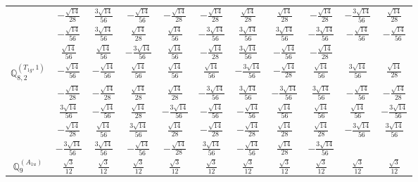 \documentclass[fleqn,10pt,landscape]{article}
\begin{document}
\begin{itemize}
{\begin{center}
\begin{longtable}{ccccccccccc}
& $ - \frac{\sqrt{14}}{28} $ & $ \frac{3 \sqrt{14}}{56} $ & $ - \frac{\sqrt{14}}{56} $ & $ - \frac{\sqrt{14}}{28} $ & $ - \frac{\sqrt{14}}{28} $ & $ \frac{\sqrt{14}}{28} $ & $ \frac{\sqrt{14}}{28} $ & $ - \frac{\sqrt{14}}{28} $ & $ - \frac{3 \sqrt{14}}{56} $ & $ \frac{\sqrt{14}}{28} $ \\
& $ - \frac{\sqrt{14}}{56} $ & $ \frac{3 \sqrt{14}}{56} $ & $ \frac{\sqrt{14}}{28} $ & $ \frac{\sqrt{14}}{56} $ & $ - \frac{3 \sqrt{14}}{56} $ & $ \frac{3 \sqrt{14}}{56} $ & $ \frac{3 \sqrt{14}}{56} $ & $ - \frac{3 \sqrt{14}}{56} $ & $ - \frac{\sqrt{14}}{56} $ & $ - \frac{\sqrt{14}}{56} $ \\
& $ \frac{\sqrt{14}}{56} $ & $ \frac{\sqrt{14}}{56} $ & $ - \frac{3 \sqrt{14}}{56} $ & $ \frac{\sqrt{14}}{56} $ & $ - \frac{\sqrt{14}}{28} $ & $ \frac{3 \sqrt{14}}{56} $ & $ - \frac{\sqrt{14}}{56} $ & $ - \frac{\sqrt{14}}{28} $ & $  $ & $  $ \\ \hline
$\mathbb{Q}_{8,2}^{(T_{1g},1)}$ & $ - \frac{\sqrt{14}}{56} $ & $ - \frac{\sqrt{14}}{56} $ & $ \frac{\sqrt{14}}{56} $ & $ \frac{\sqrt{14}}{56} $ & $ \frac{\sqrt{14}}{56} $ & $ - \frac{3 \sqrt{14}}{56} $ & $ - \frac{\sqrt{14}}{28} $ & $ \frac{\sqrt{14}}{56} $ & $ \frac{3 \sqrt{14}}{56} $ & $ \frac{\sqrt{14}}{28} $ \\
& $ - \frac{\sqrt{14}}{28} $ & $ - \frac{\sqrt{14}}{28} $ & $ \frac{\sqrt{14}}{28} $ & $ \frac{\sqrt{14}}{28} $ & $ - \frac{3 \sqrt{14}}{56} $ & $ \frac{3 \sqrt{14}}{56} $ & $ - \frac{3 \sqrt{14}}{56} $ & $ \frac{3 \sqrt{14}}{56} $ & $ - \frac{\sqrt{14}}{56} $ & $ - \frac{\sqrt{14}}{28} $ \\
& $ \frac{3 \sqrt{14}}{56} $ & $ - \frac{\sqrt{14}}{56} $ & $ \frac{\sqrt{14}}{28} $ & $ - \frac{3 \sqrt{14}}{56} $ & $ - \frac{\sqrt{14}}{56} $ & $ - \frac{\sqrt{14}}{56} $ & $ \frac{\sqrt{14}}{56} $ & $ \frac{\sqrt{14}}{56} $ & $ \frac{\sqrt{14}}{56} $ & $ - \frac{3 \sqrt{14}}{56} $ \\
& $ - \frac{\sqrt{14}}{28} $ & $ \frac{\sqrt{14}}{56} $ & $ \frac{3 \sqrt{14}}{56} $ & $ \frac{\sqrt{14}}{28} $ & $ - \frac{\sqrt{14}}{28} $ & $ - \frac{\sqrt{14}}{28} $ & $ \frac{\sqrt{14}}{28} $ & $ \frac{\sqrt{14}}{28} $ & $ - \frac{3 \sqrt{14}}{56} $ & $ \frac{3 \sqrt{14}}{56} $ \\
& $ - \frac{3 \sqrt{14}}{56} $ & $ \frac{3 \sqrt{14}}{56} $ & $ - \frac{\sqrt{14}}{56} $ & $ - \frac{\sqrt{14}}{28} $ & $ \frac{3 \sqrt{14}}{56} $ & $ - \frac{\sqrt{14}}{56} $ & $ \frac{\sqrt{14}}{28} $ & $ - \frac{3 \sqrt{14}}{56} $ & $  $ & $  $ \\ \hline
$\mathbb{Q}_{9}^{(A_{1u})}$ & $ \frac{\sqrt{3}}{12} $ & $ \frac{\sqrt{3}}{12} $ & $ \frac{\sqrt{3}}{12} $ & $ \frac{\sqrt{3}}{12} $ & $ \frac{\sqrt{3}}{12} $ & $ \frac{\sqrt{3}}{12} $ & $ \frac{\sqrt{3}}{12} $ & $ \frac{\sqrt{3}}{12} $ & $ \frac{\sqrt{3}}{12} $ & $ \frac{\sqrt{3}}{12} $ \\

\end{longtable}
\end{center}}
\end{itemize}
\end{document}
